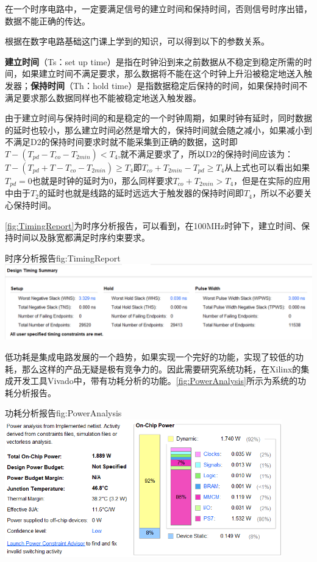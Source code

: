\documentclass[supercite]{HustGraduPaper}
\begin{document}
在一个时序电路中，一定要满足信号的建立时间和保持时间，否则信号时序出错，数据不能正确的传达。

根据在数字电路基础这门课上学到的知识，可以得到以下的参数关系。

{\bfseries 建立时间}（Ts：set up time）是指在时钟沿到来之前数据从不稳定到稳定所需的时间，如果建立时间不满足要求，那么数据将不能在这个时钟上升沿被稳定地送入触发器；{\bfseries 保持时间}（Th：hold time）是指数据稳定后保持的时间，如果保持时间不满足要求那么数据同样也不能被稳定地送入触发器。

由于建立时间与保持时间的和是稳定的一个时钟周期，如果时钟有延时，同时数据的延时也较小，那么建立时间必然是增大的，保持时间就会随之减小，如果减小到不满足D2的保持时间要求时就不能采集到正确的数据，这时即$ T-(T_{pd}-T_{co}-T_{2min})< T_4 $,就不满足要求了，所以D2的保持时间应该为：$ T-(T_{pd}+T-T_{co}-T_{2min})\ge T_4 $即$ T_{co}+T_{2min} - T_{pd} \ge T_4 $从上式也可以看出如果$ T_{pd}=0 $也就是时钟的延时为0，那么同样要求$ T_{co}+T_{2min}>T_4 $，但是在实际的应用中由于$ T_2 $的延时也就是线路的延时远远大于触发器的保持时间即$ T_4 $，所以不必要关心保持时间。

\autoref{fig:TimingReport}为时序分析报告，可以看到，在100MHz时钟下，建立时间、保持时间以及脉宽都满足时序约束要求。

\begin{generalfig}[htb]{时序分析报告}{fig:TimingReport}
	\includegraphics[width=\textwidth]{Figures/TimingReport.png}
\end{generalfig}


低功耗是集成电路发展的一个趋势，如果实现一个完好的功能，实现了较低的功耗，那么这样的产品无疑是极有竞争力的。因此需要研究系统功耗，在Xilinx的集成开发工具Vivado中，带有功耗分析的功能。\autoref{fig:PowerAnalysis}所示为系统的功耗分析报告。

\begin{generalfig}[htb]{功耗分析报告}{fig:PowerAnalysis}
	\includegraphics[width=12cm]{Figures/PowerAnalysis.png}
\end{generalfig}
\end{document}
